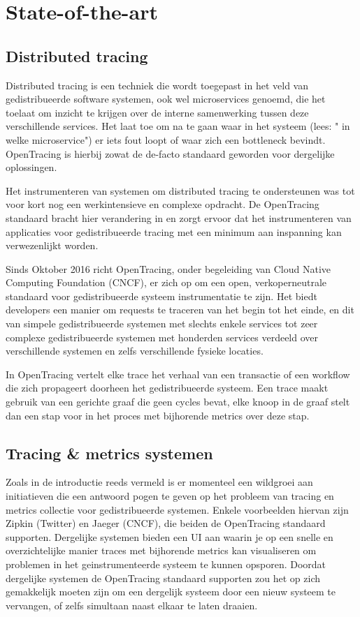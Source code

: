 \section{State-of-the-art}
\label{sec:state-of-the-art}

\subsection{Distributed tracing}
Distributed tracing is een techniek die wordt toegepast in het veld van gedistribueerde software systemen, ook wel microservices genoemd, die het toelaat om inzicht te krijgen over de interne samenwerking tussen deze verschillende services. Het laat toe om na te gaan waar in het systeem (lees: " in welke microservice") er iets fout loopt of waar zich een bottleneck bevindt. OpenTracing is hierbij zowat de de-facto standaard geworden voor dergelijke oplossingen.

Het instrumenteren van systemen om distributed tracing te ondersteunen was tot voor kort nog een werkintensieve en complexe opdracht. De OpenTracing standaard bracht hier verandering in en zorgt ervoor dat het instrumenteren van applicaties voor gedistribueerde tracing met een minimum aan inspanning kan verwezenlijkt worden. 

Sinds Oktober 2016 richt OpenTracing, onder begeleiding van Cloud Native Computing Foundation (CNCF), er zich op om een open, verkoperneutrale standaard voor gedistribueerde systeem instrumentatie te zijn. Het biedt developers een manier om requests te traceren van het begin tot het einde, en dit van simpele gedistribueerde systemen met slechts enkele services tot zeer complexe gedistribueerde systemen met honderden services verdeeld over verschillende systemen en zelfs verschillende fysieke locaties.

In OpenTracing vertelt elke trace het verhaal van een transactie of een workflow die zich propageert doorheen het gedistribueerde systeem. Een trace maakt gebruik van een gerichte graaf die geen cycles bevat, elke knoop in de graaf stelt dan een stap voor in het proces met bijhorende metrics over deze stap. \autocite{Arbezzano2017}

\subsection{Tracing \& metrics systemen}
Zoals in de introductie reeds vermeld is er momenteel een wildgroei aan initiatieven die een antwoord pogen te geven op het probleem van tracing en metrics collectie voor gedistribueerde systemen. Enkele voorbeelden hiervan zijn Zipkin (Twitter) en Jaeger (CNCF), die beiden de OpenTracing standaard supporten. Dergelijke systemen bieden een UI aan waarin je op een snelle en overzichtelijke manier traces met bijhorende metrics kan visualiseren om problemen in het geinstrumenteerde systeem te kunnen opsporen. Doordat dergelijke systemen de OpenTracing standaard supporten zou het op zich gemakkelijk moeten zijn om een dergelijk systeem door een nieuw systeem te vervangen, of zelfs simultaan naast elkaar te laten draaien.

